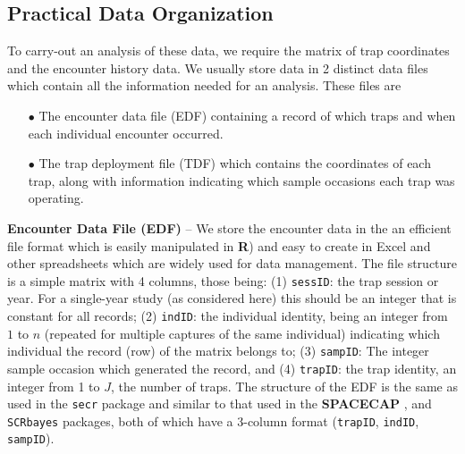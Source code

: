{\subsection{Practical Data Organization}

To carry-out an analysis of these data, we require the matrix of trap
coordinates and the encounter history data.  We usually store data in
2 distinct data files which contain all the information needed for an
analysis. These files are
\begin{itemize}
\item[$\bullet$] The encounter data file (EDF) containing a record of which
  traps and when each individual encounter occurred.
\item[$\bullet$] The trap deployment file (TDF) which contains the
  coordinates of each trap, along with information 
 indicating which sample
  occasions each trap was operating.
\end{itemize}

{\flushleft \bf Encounter Data File (EDF)} -- 
We store the encounter data in the
an efficient file format which is easily manipulated in {\bf R}) and 
easy to create in  Excel and other spreadsheets which are widely used
for data management.
The file
structure is a simple matrix with 4 columns, those being: (1)
\mbox{\tt sessID}: the trap
session or year. For a single-year study (as considered here) this
should be an integer  that is constant for all records; (2) \mbox{\tt indID}: the
individual identity, being an integer from $1$ to $n$ (repeated for
multiple captures of the same individual) indicating which
individual the record (row) of the matrix belongs to; (3) \mbox{\tt sampID}: The integer sample
occasion which generated the record, and (4) \mbox{\tt trapID}: the 
trap identity, an
integer from 1 to $J$, the number of traps.  The structure of the EDF
is the same as used in the \mbox{\tt secr} package \citep{efford:2011}
and similar to that used
in the {\bf SPACECAP} \citep{gopalaswamy_etal:2012mee}, and
\mbox{\tt SCRbayes} \citep{russell_etal:2012} packages, both of which 
have a 3-column format (\mbox{\tt trapID}, \mbox{\tt indID}, \mbox{\tt
  sampID}).

}
